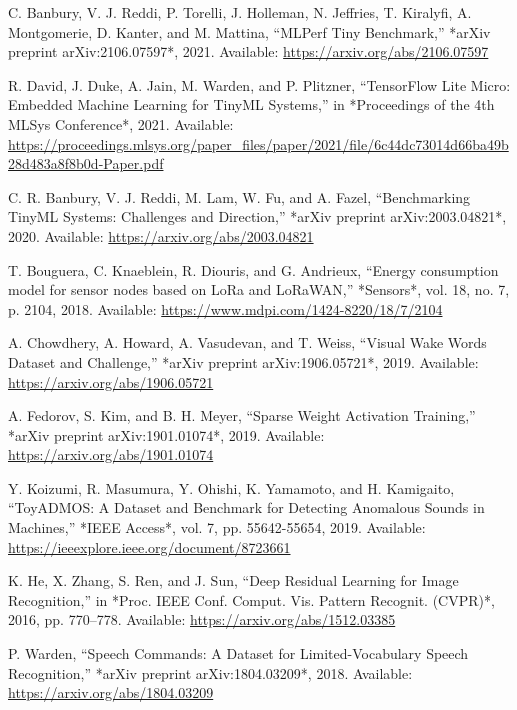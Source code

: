 \documentclass[conference]{IEEEtran}
\begin{document}
\begin{thebibliography}{00}

 C. Banbury, V. J. Reddi, P. Torelli, J. Holleman, N. Jeffries, T. Kiralyfi, A. Montgomerie, D. Kanter, and M. Mattina, ``MLPerf Tiny Benchmark,'' *arXiv preprint arXiv:2106.07597*, 2021. Available: \url{https://arxiv.org/abs/2106.07597}

 R. David, J. Duke, A. Jain, M. Warden, and P. Plitzner, ``TensorFlow Lite Micro: Embedded Machine Learning for TinyML Systems,'' in *Proceedings of the 4th MLSys Conference*, 2021. Available: \url{https://proceedings.mlsys.org/paper_files/paper/2021/file/6c44dc73014d66ba49b28d483a8f8b0d-Paper.pdf}

 C. R. Banbury, V. J. Reddi, M. Lam, W. Fu, and A. Fazel, ``Benchmarking TinyML Systems: Challenges and Direction,'' *arXiv preprint arXiv:2003.04821*, 2020. Available: \url{https://arxiv.org/abs/2003.04821}

 T. Bouguera, C. Knaeblein, R. Diouris, and G. Andrieux, ``Energy consumption model for sensor nodes based on LoRa and LoRaWAN,'' *Sensors*, vol. 18, no. 7, p. 2104, 2018. Available: \url{https://www.mdpi.com/1424-8220/18/7/2104}

 A. Chowdhery, A. Howard, A. Vasudevan, and T. Weiss, ``Visual Wake Words Dataset and Challenge,'' *arXiv preprint arXiv:1906.05721*, 2019. Available: \url{https://arxiv.org/abs/1906.05721}

 A. Fedorov, S. Kim, and B. H. Meyer, ``Sparse Weight Activation Training,'' *arXiv preprint arXiv:1901.01074*, 2019. Available: \url{https://arxiv.org/abs/1901.01074}

 Y. Koizumi, R. Masumura, Y. Ohishi, K. Yamamoto, and H. Kamigaito, ``ToyADMOS: A Dataset and Benchmark for Detecting Anomalous Sounds in Machines,'' *IEEE Access*, vol. 7, pp. 55642-55654, 2019. Available: \url{https://ieeexplore.ieee.org/document/8723661}

 K. He, X. Zhang, S. Ren, and J. Sun, ``Deep Residual Learning for Image Recognition,'' in *Proc. IEEE Conf. Comput. Vis. Pattern Recognit. (CVPR)*, 2016, pp. 770–778. Available: \url{https://arxiv.org/abs/1512.03385}

 P. Warden, ``Speech Commands: A Dataset for Limited-Vocabulary Speech Recognition,'' *arXiv preprint arXiv:1804.03209*, 2018. Available: \url{https://arxiv.org/abs/1804.03209}


\end{thebibliography}
\end{document}
